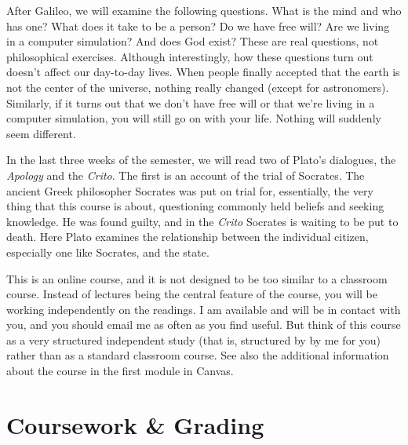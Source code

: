 \documentclass[11pt,oneside]{article}
\begin{document}
After Galileo, we will examine the following questions. What is the mind and who has one? What does it take to be a person? Do we have free will? Are we living in a computer simulation? And does God exist? These are real questions, not philosophical exercises. Although interestingly, how these questions turn out doesn’t affect our day-to-day lives. When people finally accepted that the earth is not the center of the universe, nothing really changed (except for astronomers). Similarly, if it turns out that we don’t have free will or that we’re living in a computer simulation, you will still go on with your life. Nothing will suddenly seem different.

In the last three weeks of the semester, we will read two of Plato’s dialogues, the \textit{Apology} and the \textit{Crito}. The first is an account of the trial of Socrates. The ancient Greek philosopher Socrates was put on trial for, essentially, the very thing that this course is about, questioning commonly held beliefs and seeking knowledge. He was found guilty, and in the \textit{Crito} Socrates is waiting to be put to death. Here Plato examines the relationship between the individual citizen, especially one like Socrates, and the state.
\begin{center}
\end{center}
This is an online course, and it is not designed to be too similar to a classroom course. Instead
of lectures being the central feature of the course, you will be working independently on the
readings. I am available and will be in contact with you, and you should email me as often
as you find useful. But think of this course as a very structured independent study (that
is, structured by by me for you) rather than as a standard classroom course. See also the
additional information about the course in the first module in Canvas. 



\section{Coursework \& Grading}
\end{document}

